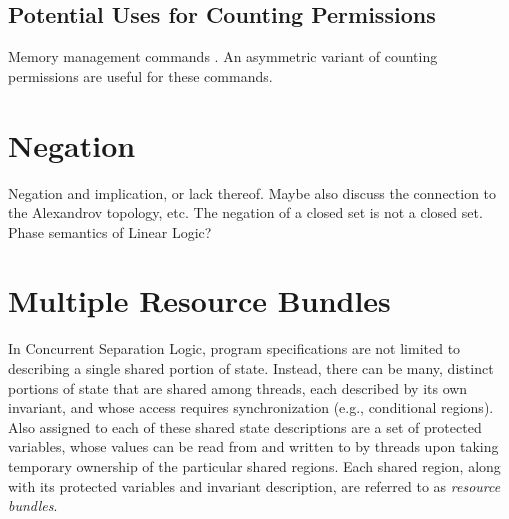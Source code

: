 \documentclass[11pt]{report}
\begin{document}









 

\subsection{Potential Uses for Counting Permissions}

Memory management commands \cite{wmsldetails,lola11}. An asymmetric variant of counting permissions are useful for these commands. 

\section{Negation}
    
Negation and implication, or lack thereof. Maybe also discuss the connection to the Alexandrov topology, etc. The negation of a closed set is not a closed set. Phase semantics of Linear Logic? 

\section{Multiple Resource Bundles}

In Concurrent Separation Logic, program specifications are not limited to describing a single shared portion of state. Instead, there can be many, distinct portions of state that are shared among threads, each described by its own invariant, and whose access requires synchronization (e.g., conditional regions). Also assigned to each of these shared state descriptions are a set of protected variables, whose values can be read from and written to by threads upon taking temporary ownership of the particular shared regions. Each shared region, along with its protected variables and invariant description, are referred to as \emph{resource bundles}. 
\end{document}
